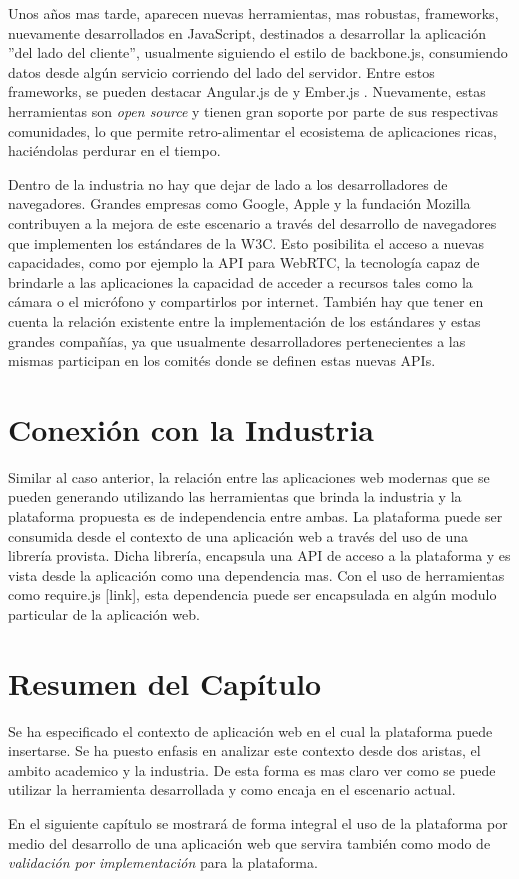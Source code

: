 Unos años mas tarde, aparecen nuevas herramientas, mas robustas, frameworks, nuevamente desarrollados en JavaScript, destinados a desarrollar la aplicación ''del lado del cliente'', usualmente siguiendo el estilo de backbone.js, consumiendo datos desde algún servicio corriendo del lado del servidor. Entre estos frameworks, se pueden destacar Angular.js de \citep{ind:angular} y Ember.js \citep{ind:ember}. Nuevamente, estas herramientas son \emph{open source} y tienen gran soporte por parte de sus respectivas comunidades, lo que permite retro-alimentar el ecosistema de aplicaciones ricas, haciéndolas perdurar en el tiempo.

Dentro de la industria no hay que dejar de lado a los desarrolladores de navegadores. Grandes empresas como Google, Apple y la fundación Mozilla contribuyen a la mejora de este escenario a través del desarrollo de navegadores que implementen los estándares de la W3C. Esto posibilita el acceso a nuevas capacidades, como por ejemplo la API para WebRTC, la tecnología capaz de brindarle a las aplicaciones la capacidad de acceder a recursos tales como la cámara o el micrófono y compartirlos por internet. También hay que tener en cuenta la relación existente entre la implementación de los estándares y estas grandes compañías, ya que usualmente desarrolladores pertenecientes a las mismas participan en los comités donde se definen estas nuevas APIs. 

\section{Conexión con la Industria} \label{sec:extension_industria_conexion}

Similar al caso anterior, la relación entre las aplicaciones web modernas que se pueden generando utilizando las herramientas que brinda la industria y la plataforma propuesta es de independencia entre ambas. 
La plataforma puede ser consumida desde el contexto de una aplicación web a través del uso de una librería provista. Dicha librería, encapsula una API de acceso a la plataforma y es vista desde la aplicación como una dependencia mas. Con el uso de herramientas como require.js [link], esta dependencia puede ser encapsulada en algún modulo particular de la aplicación web. 

\section{Resumen del Capítulo} \label{sec:extension_conclusion}
Se ha especificado el contexto de aplicación web en el cual la plataforma puede insertarse. Se ha puesto enfasis en analizar este contexto desde dos aristas, el ambito academico y la industria. De esta forma es mas claro ver como se puede utilizar la herramienta desarrollada y como encaja en el escenario actual.

En el siguiente capítulo se mostrará de forma integral el uso de la plataforma por medio del desarrollo de una aplicación web que servira también como modo de \emph{validación por implementación} para la plataforma.